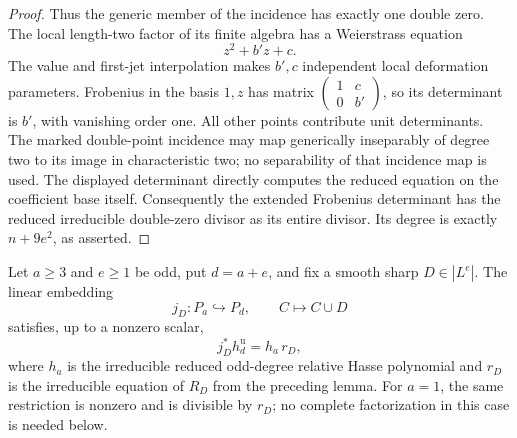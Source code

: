 \begin{proof}
Thus the generic member of the incidence has exactly one
double zero. The local length-two factor of its finite algebra
has a Weierstrass equation
\[
                             z^2+b'z+c.
\]
The value and first-jet interpolation makes $b',c$ independent
local deformation parameters. Frobenius in the basis $1,z$
has matrix $\left(\begin{smallmatrix}1&c\\0&b'\end{smallmatrix}\right)$,
so its determinant is $b'$, with vanishing order one.
All other points contribute unit determinants.
The marked double-point incidence may map generically inseparably
of degree two to its image in characteristic two; no separability
of that incidence map is used. The displayed determinant directly
computes the reduced equation on the coefficient base itself.
Consequently the extended Frobenius determinant has the reduced
irreducible double-zero divisor as its entire divisor. Its
degree is exactly $n+9e^2$, as asserted.
\end{proof}

\begin{lemma}
\label{lem:ss-even-boundary-factorization}
Let $a\ge3$ and $e\ge1$ be odd, put $d=a+e$, and fix a smooth
sharp $D\in|L^e|$. The linear embedding
\[
 j_D:P_a\hookrightarrow P_d,\qquad C\longmapsto C\cup D
\]
satisfies, up to a nonzero scalar,
\[
                         j_D^*h_d^{\mathrm u}=h_a\,r_D,
\]
where $h_a$ is the irreducible reduced odd-degree relative
Hasse polynomial and $r_D$ is the irreducible equation of
$R_D$ from the preceding lemma.
For $a=1$, the same restriction is nonzero and is divisible
by $r_D$; no complete factorization in this case is needed below.
\end{lemma}

